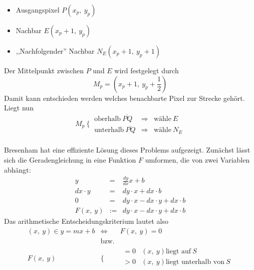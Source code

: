 \begin{Algorithmus}
\begin{itemize}
        \item Ausgangspixel $P\left( x_p,~ y_p \right)$
        \item Nachbar $E\left( x_p + 1,~ y_p \right)$
        \item ,,Nachfolgender'' Nachbar $N_E\left( x_p + 1,~ y_p + 1 \right)$
    \end{itemize}
    Der Mittelpunkt zwischen $P$ und $E$ wird festgelegt durch
    \begin{equation*}
        M_p = \left( x_p + 1,~ y_p + \frac{1}{2} \right)
    \end{equation*}
    Damit kann entschieden werden welches benachbarte Pixel zur Strecke gehört. 
    Liegt nun
    \begin{equation*}
        M_p ~\Big\{~ \begin{matrix}
            \textrm{oberhalb}~ \overline{PQ} &\Rightarrow& \textrm{wähle}~ E \\ 
            \textrm{unterhalb}~ \overline{PQ} &\Rightarrow& \textrm{wähle}~ N_E 
        \end{matrix}
    \end{equation*}\\
    Bresenham hat eine effiziente Lösung dieses Problems aufgezeigt.
    Zunächst lässt sich die Geradengleichung in eine Funktion $F$ umformen, die von 
    zwei Variablen abhängt: 
    \begin{equation*}\begin{matrix}
        y & = & \frac{dy}{dx} x + b \\
        dx \cdot y & = & dy \cdot x + dx \cdot b \\
        0 & = & dy \cdot x - dx \cdot y + dx \cdot b \\
        F\left(x,~ y\right) & := & dy \cdot x - dx \cdot y + dx \cdot b 
    \end{matrix}\end{equation*}
    Das arithmetische Entscheidungskriterium lautet also 
    \begin{equation*}\begin{matrix}
        (x,~ y) \in y = mx + b & \Leftrightarrow & F\left(x,~ y\right) = 0 \\
        & \textrm{bzw.} & \\
        F\left(x,~ y\right) & \Bigg\{ & \begin{matrix}
            = 0 & \left(x,~ y\right) \textrm{liegt auf}~ S \\
            > 0 & \left(x,~ y\right) \textrm{liegt unterhalb von}~ S \\

\end{matrix}
\end{matrix}
\end{equation*}
\end{Algorithmus}
